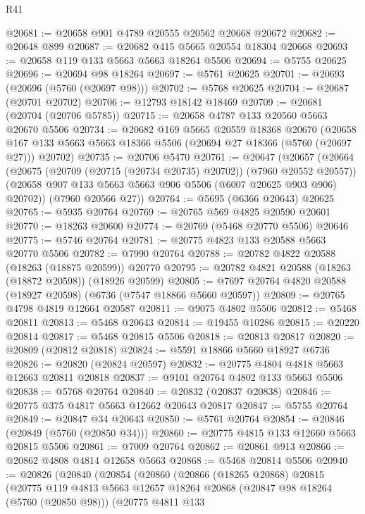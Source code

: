 \begin{lexlean}{R41}
\begin{coremodule}
@20681 := @20658 @901 @4789 @20555 @20562 @20668 @20672
@20682 := @20648 @899
@20687 := @20682 @415 @5665 @20554 @18304 @20668
@20693 := @20658 @119 @133 @5663 @5663 @18264 @5506
@20694 := @5755 @20625
@20696 := @20694 @98 @18264
@20697 := @5761 @20625
@20701 := @20693 (@20696 (@5760 (@20697 @98)))
@20702 := @5768 @20625
@20704 := @20687 (@20701 @20702)
@20706 := @12793 @18142 @18469
@20709 := @20681 (@20704 (@20706 @5785))
@20715 := @20658 @4787 @133 @20560 @5663 @20670 @5506
@20734 := @20682
    @169
    @5665
    @20559
    @18368
    @20670
    (@20658 @167 @133 @5663 @5663 @18366 @5506 (@20694 @27 @18366 (@5760 (@20697 @27))) @20702)
@20735 := @20706 @5470
@20761 := @20647
    (@20657
      (@20664
        (@20675 (@20709 (@20715 (@20734 @20735) @20702)) (@7960 @20552 @20557))
        (@20658 @907 @133 @5663 @5663 @906 @5506 (@6007 @20625 @903 @906) @20702))
      (@7960 @20566 @27))
@20764 := @5695 (@6366 @20643) @20625
@20765 := @5935 @20764
@20769 := @20765 @569 @4825 @20590 @20601
@20770 := @18263 @20600
@20774 := @20769 (@5468 @20770 @5506) @20646
@20775 := @5746 @20764
@20781 := @20775 @4823 @133 @20588 @5663 @20770 @5506
@20782 := @7990 @20764
@20788 := @20782 @4822 @20588 (@18263 (@18875 @20599)) @20770
@20795 := @20782 @4821 @20588 (@18263 (@18872 @20598)) (@18926 @20599)
@20805 := @7697 @20764 @4820 @20588 (@18927 @20598) (@6736 (@7547 @18866 @5660 @20597))
@20809 := @20765 @4798 @4819 @12664 @20587
@20811 := @9075 @4802 @5506
@20812 := @5468 @20811
@20813 := @5468 @20643
@20814 := @19455 @10286
@20815 := @20220 @20814
@20817 := @5468 @20815 @5506
@20818 := @20813 @20817
@20820 := @20809 (@20812 @20818)
@20824 := @5591 @18866 @5660 @18927 @6736
@20826 := @20820 (@20824 @20597)
@20832 := @20775 @4804 @4818 @5663 @12663 @20811 @20818
@20837 := @9101 @20764 @4802 @133 @5663 @5506
@20838 := @5768 @20764
@20840 := @20832 (@20837 @20838)
@20846 := @20775 @375 @4817 @5663 @12662 @20643 @20817
@20847 := @5755 @20764
@20849 := @20847 @34 @20643
@20850 := @5761 @20764
@20854 := @20846 (@20849 (@5760 (@20850 @34)))
@20860 := @20775 @4815 @133 @12660 @5663 @20815 @5506
@20861 := @7009 @20764
@20862 := @20861 @913
@20866 := @20862 @4808 @4814 @12658 @5663
@20868 := @5468 @20814 @5506
@20940 := @20826
    (@20840
      (@20854
        (@20860
          (@20866
            (@18265 @20868)
            @20815
            (@20775
              @119
              @4813
              @5663
              @12657
              @18264
              @20868
              (@20847 @98 @18264 (@5760 (@20850 @98)))
              (@20775
                @4811
                @133

\end{coremodule}
\end{lexlean}
